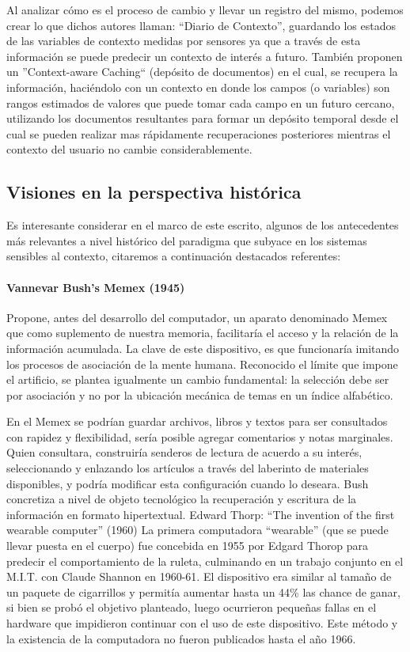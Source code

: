 Al analizar cómo es el proceso de cambio y llevar un registro del mismo, podemos
crear
lo que dichos autores llaman: “Diario de Contexto”, guardando los estados de las
variables de contexto medidas por sensores ya que a través de esta información
se puede
predecir un contexto de interés a futuro. También proponen un ''Context-aware
Caching``
(depósito de documentos) en el cual, se recupera la información, haciéndolo con
un
contexto en donde los campos (o variables) son rangos estimados de valores que
puede
tomar cada campo en un futuro cercano, utilizando los documentos resultantes
para
formar un depósito temporal desde el cual se pueden realizar mas rápidamente
recuperaciones posteriores mientras el contexto del usuario no cambie
considerablemente.

\subsection {Visiones en la perspectiva histórica}
 
Es interesante considerar en el marco de este escrito, algunos de los
antecedentes más
relevantes a nivel histórico del paradigma que subyace en los sistemas sensibles
al
contexto, citaremos a continuación destacados referentes:


\paragraph {Vannevar Bush's Memex (1945)}

Propone, antes del desarrollo del computador, un aparato denominado Memex que
como
suplemento de nuestra memoria, facilitaría el acceso y la relación de la
información
acumulada. La clave de este dispositivo, es que funcionaría imitando los
procesos de
asociación de la mente humana. Reconocido el límite que impone el artificio, se
plantea
igualmente un cambio fundamental: la selección debe ser por asociación y no por
la
ubicación mecánica de temas en un índice alfabético.

En el Memex se podrían guardar archivos, libros y textos para ser consultados
con
rapidez y flexibilidad, sería posible agregar comentarios y notas marginales.
Quien
consultara, construiría senderos de lectura de acuerdo a su interés,
seleccionando y
enlazando los artículos a través del laberinto de materiales disponibles, y
podría
modificar esta configuración cuando lo deseara. Bush concretiza a nivel de
objeto
tecnológico la recuperación y escritura de la información en formato
hipertextual.
Edward Thorp: “The invention of the first wearable computer” (1960)
La primera computadora “wearable” (que se puede llevar puesta en el cuerpo) fue
concebida en 1955 por Edgard Thorop para predecir el comportamiento de la
ruleta,
culminando en un trabajo conjunto en el M.I.T. con Claude Shannon en 1960-61. El
dispositivo era similar al tamaño de un paquete de cigarrillos y permitía
aumentar hasta
un 44\% las chance de ganar, si bien se probó el objetivo planteado, luego
ocurrieron
pequeñas fallas en el hardware que impidieron continuar con el uso de este
dispositivo.
Este método y la existencia de la computadora no fueron publicados hasta el año
1966.


